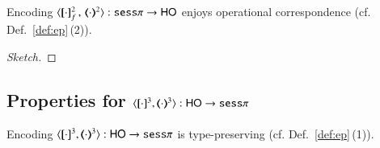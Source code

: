 \begin{proposition}\rm
	\label{app:enc_sesp_to_HO_oc}
	Encoding $\fencod{\cdot}{\cdot}{2}{f}: \sesp \to \HO$ 
	enjoys operational correspondence (cf. Def.~\ref{def:ep}\,(2)).
\end{proposition}

\begin{proof}[Sketch]
\end{proof}



\subsection{Properties for $\encod{\cdot}{\cdot}{3}: \HO \to \sesp$}

\begin{proposition}\rm
	\label{app:enc_HO_to_sessp_t}
	Encoding $\encod{\cdot}{\cdot}{3}: \HO \to \sesp$  is type-preserving (cf. Def.~\ref{def:ep}\,(1)).
\end{proposition}

